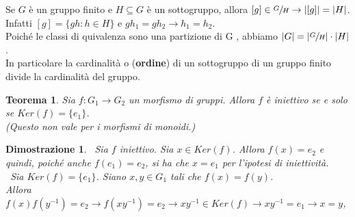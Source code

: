 \documentclass[a4paper,12pt]{article}
\theoremstyle{def}
\theoremstyle{prop}
\theoremstyle{esempio}
\theoremstyle{dimostrazione}
\newtheorem*{dimostrazione}{Dimostrazione}
\theoremstyle{teo}
\newtheorem*{teorema}{Teorema}
\theoremstyle{osservazione}
\begin{document}
Se \(G\) è un gruppo finito e \(H \subseteq G\) è un sottogruppo, allora \([g] \in \sfrac{G}{H} \rightarrow |[g]| = |H|\).\\
Infatti \([g] = \{gh : h \in  H\}\) e \(gh_1 = gh_2 \rightarrow h_1 = h_2\).\\
Poiché le classi di quivalenza sono una partizione di G , abbiamo \(|G| = |\sfrac{G}{H}| \cdot |H|\).\\
In particolare la cardinalità o (\textbf{ordine}) di un sottogruppo di un gruppo finito divide la cardinalità del gruppo.\\

\begin{teorema}
	Sia \(f : G_1 \rightarrow G_2\) un morfismo di gruppi. Allora \(f\) è iniettivo se e solo se \(Ker(f) = \{e_1\}\).\\
	(Questo non vale per i morfismi di monoidi.)
\end{teorema}

\begin{dimostrazione}
	\
	Sia \(f\) iniettivo. Sia \(x \in Ker(f)\). Allora \(f(x) = e_2\) e quindi, poiché anche \(f(e_1) = e_2\), si ha che \(x = e_1\)
	per l'ipotesi di iniettività.\\\
	Sia \(Ker(f) = \{e_1\}\). Siano \(x,y \in G_1\) tali che \(f(x) = f(y)\).\\
	Allora \(f(x)f(y^{-1}) = e_2 \rightarrow  f(xy^{-1}) = e_2 \rightarrow  xy^{-1} \in Ker(f) \rightarrow xy^{-1} = e_1 \rightarrow
	x=y\),
\end{dimostrazione}
\end{document}
